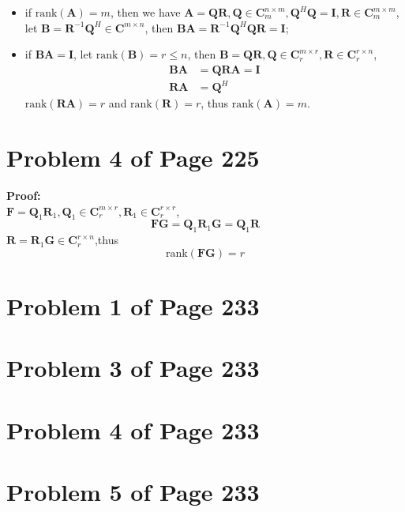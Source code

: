 \documentclass[12pt,a4paper]{article}
\newcommand{\mysection}[2]{
\section{Problem #1 of Page #2}	
	}
\begin{document}
\begin{itemize}
	\item if $\text{rank}(\bm{A}) = m $, then we have $\bm{A} = \bm{QR}, \bm{Q} \in \mathbf{C}_m^{n\times m} , \bm{Q}^H\bm{Q}=\bm{I},
	\bm{R} \in \mathbf{C}_m^{m\times m}$,
	 let $\bm{B} = \bm{R}^{-1}\bm{Q}^H \in \mathbf{C}^{m\times n}$, then $\bm{BA} = \bm{R}^{-1}\bm{Q}^H\bm{QR} = \bm{I}$;
	\item if $\bm{BA} = \bm{I}$, let $
	 \text{rank}(\bm{B}) = r \leq n$,
	then $ \bm{B} = \bm{Q}\bm{R}, 
	 \bm{Q} \in \mathbf{C}_{r}^{m\times {r}}, \bm{R}\in \mathbf{C}_{r}^{{r}\times n} 
	 $,
	 \[ \begin{split} 
		 \bm{BA} &= \bm{Q}\bm{R}\bm{A}= \bm{I} \\
		 \bm{R}\bm{A} &= \bm{Q}^H
		\end{split} 
	 \]
	  $\text{rank}(\bm{RA}) = r $ and $\text{rank}(\bm{R}) = r$, 
	 thus $\text{rank}(\bm{A}) = m$.
\end{itemize}
	
\mysection{4}{225}
\textbf{Proof:}\\
$\bm{F} = \bm{Q}_1\bm{R}_1, \bm{Q}_1\in\mathbf{C}_r^{m\times r}, \bm{R}_1\in\mathbf{C}_r^{r\times r}$,
\[
	\bm{FG} = \bm{Q}_1\bm{R}_1\bm{G} = \bm{Q}_1 \bm{R}
\]
$\bm{R} = \bm{R}_1\bm{G}\in \mathbf{C}_r^{r\times n}$,thus
\[
	\text{rank}(\bm{FG}) = r
\]

\mysection{1}{233}



\mysection{3}{233}

\mysection{4}{233}

\mysection{5}{233} 
\end{document}
